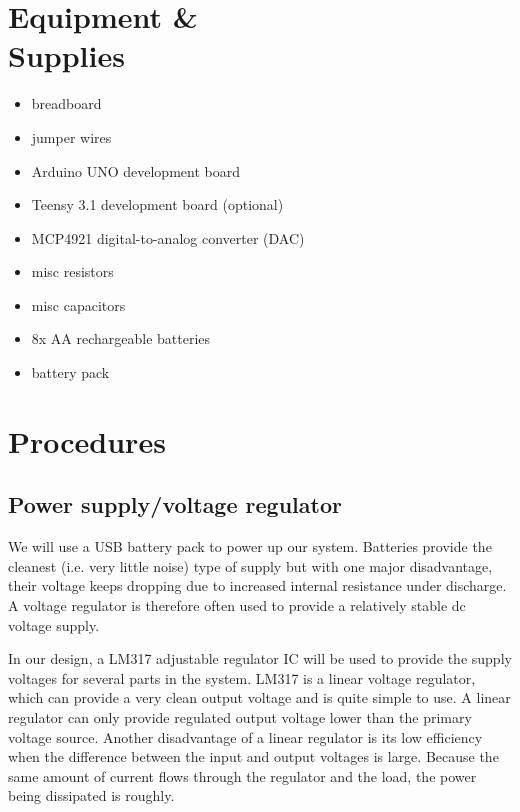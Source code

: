 \documentclass[letterpaper, 11pt]{article}
\begin{document}
\newpage
\section{Equipment \& \\Supplies}

\begin{itemize}[itemsep=0.5ex]
\item breadboard
\item jumper wires
\item Arduino UNO development board
\item Teensy 3.1 development board (optional)
\item MCP4921 digital-to-analog converter (DAC)
\item misc resistors
\item misc capacitors
\item 8x AA rechargeable batteries
\item battery pack
\end{itemize}



\newpage
\section{Procedures}

\subsection{Power supply/voltage regulator}

We will use a USB battery pack to power up our system. Batteries provide the cleanest (i.e. very little noise) type of supply but with one major disadvantage, their voltage keeps dropping due to increased internal resistance under discharge. A voltage regulator is therefore often used to provide a relatively stable dc voltage supply.

In our design, a LM317 adjustable regulator IC will be used to provide the supply voltages for several parts in the system. LM317 is a linear voltage regulator, which can provide a very clean output voltage and is quite simple to use. A linear regulator can only provide regulated output voltage lower than the primary voltage source. Another disadvantage of a linear regulator is its low efficiency when the difference between the input and output voltages is large. Because the same amount of current flows through the regulator and the load, the power being dissipated is roughly.
\end{document}
